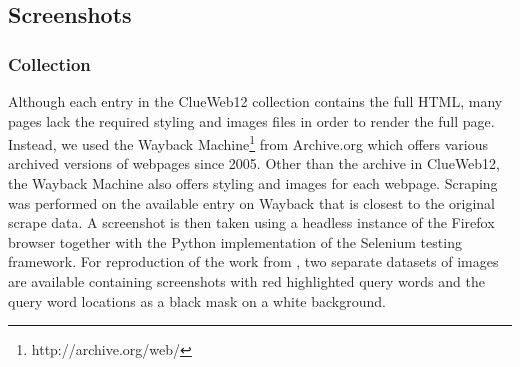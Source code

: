 \subsection{Screenshots} \label{sec:screenshotsec}



\subsubsection{Collection}
Although each entry in the ClueWeb12 collection contains the full HTML, many pages lack the required styling and images files in order to render the full page. Instead, we used the Wayback Machine\footnote{http://archive.org/web/} from Archive.org which offers various archived versions of webpages since 2005. Other than the archive in ClueWeb12, the Wayback Machine also offers styling and images for each webpage. Scraping was performed on the available entry on Wayback that is closest to the original scrape data. A screenshot is then taken using a headless instance of the Firefox browser together with the Python implementation of the Selenium testing framework. 
For reproduction of the work from \citet{fan2017learning}, two separate datasets of images are available containing screenshots with red highlighted query words and the query word locations as a black mask on a white background. 

